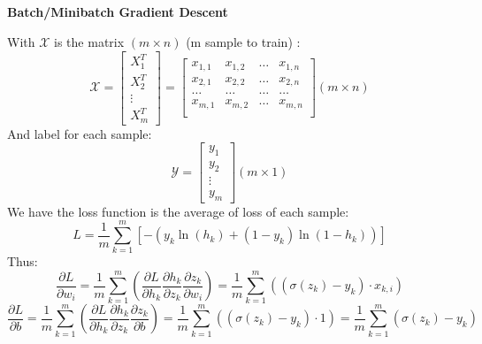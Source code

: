 \documentclass{article}
\begin{document}
    \\ \\ \\ \\
    \begin{center}
        \LARGE \textbf{Batch/Minibatch Gradient Descent}
    \end{center}
    With $\mathcal{X}$ is the matrix $(m \times n)$ (m sample to train) : 
    \[
        \mathcal{X} = 
        \begin{bmatrix}
            X_1^{T} \\ X_2^{T} \\ \vdots \\ X_m^{T}
        \end{bmatrix} = 
        \begin{bmatrix}
            x_{1, 1} & x_{1, 2} & \hdots & x_{1, n} \\
            x_{2, 1} & x_{2, 2} & \hdots & x_{2, n} \\
            \hdots & \hdots & \hdots & \hdots \\
            x_{m, 1} & x_{m, 2} & \hdots & x_{m, n} \\
        \end{bmatrix} (m \times n)
    \]
    And label for each sample:
    \[
        \mathcal{Y} = 
        \begin{bmatrix}
            y_1 \\ y_2 \\ \vdots \\ y_m
        \end{bmatrix} (m \times 1)
    \]
    We have the loss function is the average of loss of each sample:
        \[
            L = \frac{1}{m}\sum_{k=1}^{m}\left[
                -\left( y_k\ln\left(h_k\right) + (1-y_k)\ln\left(1-h_k\right)\right)
                \right]
        \]
    Thus:
    \[
        \frac{\partial L}{\partial w_i} = 
        \frac{1}{m}\sum_{k=1}^{m}\left(
            \frac{\partial L}{\partial h_k}
            \frac{\partial h_k}{\partial z_k}
            \frac{\partial z_k}{\partial w_i}
        \right) = 
        \frac{1}{m}\sum_{k=1}^{m}\left(
            (\sigma(z_k) - y_k) \cdot x_{k,i} 
        \right)
    \]
    \[
        \frac{\partial L}{\partial b} = 
        \frac{1}{m}\sum_{k=1}^{m}\left(
            \frac{\partial L}{\partial h_k}
            \frac{\partial h_k}{\partial z_k}
            \frac{\partial z_k}{\partial b}
        \right) = 
        \frac{1}{m}\sum_{k=1}^{m}\left(
            (\sigma(z_k) - y_k) \cdot 1 
        \right) = 
        \frac{1}{m}\sum_{k=1}^{m}\left(
            \sigma(z_k) - y_k  
        \right)
    \]
\end{document}
